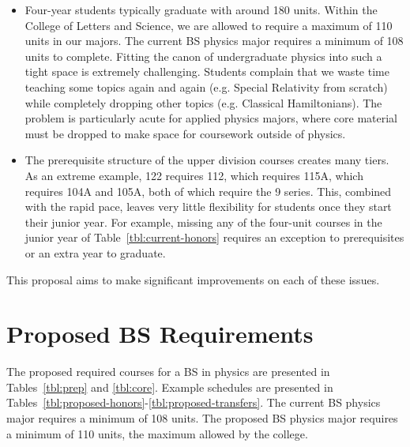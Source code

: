 \documentclass[12pt]{article}
\begin{document}
\begin{itemize}
\item Four-year students typically graduate with around 180 units.  Within the College of Letters and Science, we are allowed to require a maximum of 110 units in our majors.  
The current BS physics major requires a minimum of 108 units to complete.  Fitting the canon of undergraduate physics into such a tight space is extremely challenging.  Students complain that we waste time teaching some topics again and again (e.g. Special Relativity from scratch) while completely dropping other topics (e.g. Classical Hamiltonians).  The problem is particularly acute for applied physics majors, where core material must be dropped to make space for coursework outside of physics.

\item The prerequisite structure of the upper division courses creates many tiers.  
As an extreme example, 122 requires 112, which requires 115A, which requires 104A and 105A, both of which require the 9 series.  This, combined with the rapid pace, leaves very little flexibility for students once they start their junior year.  For example, missing any of the four-unit courses in the junior year of Table~\ref{tbl:current-honors} requires an exception to prerequisites or an extra year to graduate.
\end{itemize}
This proposal aims to make significant improvements on each of these issues.

\newpage

\section{Proposed BS Requirements}

The proposed required courses for a BS in physics are presented in Tables~\ref{tbl:prep} and \ref{tbl:core}.  Example schedules are presented in Tables~\ref{tbl:proposed-honors}-\ref{tbl:proposed-transfers}.  The current BS physics major requires a minimum of 108 units.  The proposed BS physics major requires a minimum of 110 units, the maximum allowed by the college.  
\end{document}
